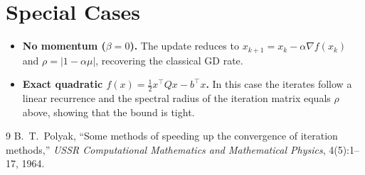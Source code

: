 \documentclass{article}
\begin{document}
\section*{Special Cases}
\begin{itemize}
\item \textbf{No momentum ($\beta=0$).} The update reduces to
  $x_{k+1}=x_{k}-\alpha\nabla f(x_{k})$ and $\rho=|1-\alpha\mu|$,
  recovering the classical GD rate.
\item \textbf{Exact quadratic $f(x)=\tfrac12 x^{\top}Qx-b^{\top}x$.}
  In this case the iterates follow a linear recurrence and the
  spectral radius of the iteration matrix equals $\rho$ above,
  showing that the bound is tight.
\end{itemize}

\begin{thebibliography}{9}
B.~T.~Polyak,
\newblock ``Some methods of speeding up the convergence of iteration methods,''
\newblock \emph{USSR Computational Mathematics and Mathematical Physics}, 4(5):1–17, 1964.
\end{thebibliography}
\end{document}
